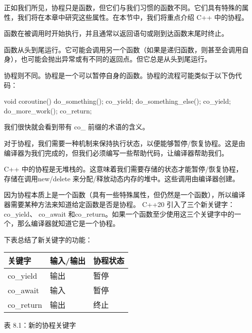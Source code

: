 
正如我们所见，协程只是函数，但它们与我们习惯的函数不同。它们具有特殊的属性，我们将在本章中研究这些属性。在本节中，我们将重点介绍 C++ 中的协程。

函数在被调用时开始执行，并且通常以返回语句或刚到达函数末尾时终止。

函数从头到尾运行。它可能会调用另一个函数（如果是递归函数，则甚至会调用自身），也可能会抛出异常或有不同的返回点。但它总是从头到尾运行。

协程则不同。协程是一个可以暂停自身的函数。协程的流程可能类似于以下伪代码：

\begin{cpp}
void coroutine() {
    do_something();
    co_yield;
    do_something_else();
    co_yield;
    do_more_work();
    co_return;
}
\end{cpp}

我们很快就会看到带有 co\_ 前缀的术语的含义。

对于协程，我们需要一种机制来保持执行状态，以便能够暂停/恢复协程。这是由编译器为我们完成的，但我们必须编写一些帮助代码，让编译器帮助我们。

C++ 中的协程是无堆栈的。这意味着我们需要存储的状态才能暂停/恢复协程，存储在调用new/delete 来分配/释放动态内存的堆中。这些调用由编译器创建。


因为协程本质上是一个函数（具有一些特殊属性，但仍然是一个函数），所以编译器需要某种方法来知道给定函数是否是协程。 C++20 引入了三个新关键字： co\_yield、 co\_await 和co\_return。如果一个函数至少使用这三个关键字中的一个，那么编译器就知道它是一个协程。

下表总结了新关键字的功能：

\begin{longtable}{|l|l|l|}
\hline
\textbf{关键字} & \textbf{输入/输出} & \textbf{协程状态} \\ \hline
\endfirsthead
%
\endhead
%
co\_yield    & 输出             & 暂停            \\ \hline
co\_await    & 输入             & 暂停            \\ \hline
co\_return   & 输出             & 终止            \\ \hline
\end{longtable}

\begin{center}
表 8.1：新的协程关键字
\end{center}

